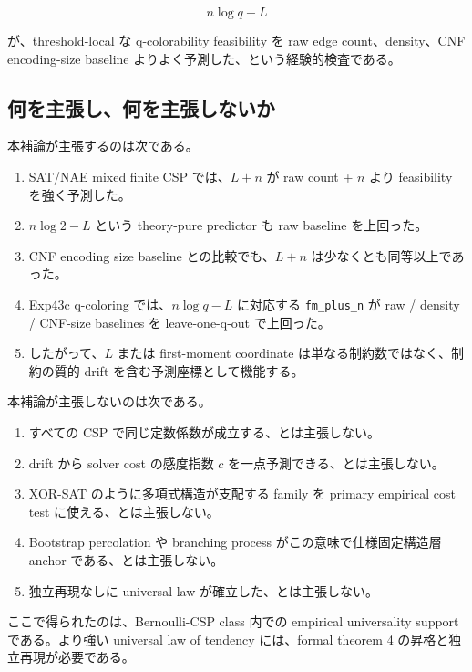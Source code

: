 \documentclass[12pt,a4paper]{article}
\begin{document}
\[
n\log q - L
\]

が、threshold-local な q-colorability feasibility を raw edge count、density、CNF encoding-size baseline よりよく予測した、という経験的検査である。

\subsection{何を主張し、何を主張しないか}\label{ux4f55ux3092ux4e3bux5f35ux3057ux4f55ux3092ux4e3bux5f35ux3057ux306aux3044ux304b}

本補論が主張するのは次である。

\begin{enumerate}
\def\labelenumi{\arabic{enumi}.}
\tightlist
\item
  SAT/NAE mixed finite CSP では、\(L+n\) が raw count + \(n\) より feasibility を強く予測した。
\item
  \(n\log2-L\) という theory-pure predictor も raw baseline を上回った。
\item
  CNF encoding size baseline との比較でも、\(L+n\) は少なくとも同等以上であった。
\item
  Exp43c q-coloring では、\(n\log q-L\) に対応する \texttt{fm\_plus\_n} が raw / density / CNF-size baselines を leave-one-q-out で上回った。
\item
  したがって、\(L\) または first-moment coordinate は単なる制約数ではなく、制約の質的 drift を含む予測座標として機能する。
\end{enumerate}

本補論が主張しないのは次である。

\begin{enumerate}
\def\labelenumi{\arabic{enumi}.}
\tightlist
\item
  すべての CSP で同じ定数係数が成立する、とは主張しない。
\item
  drift から solver cost の感度指数 \(c\) を一点予測できる、とは主張しない。
\item
  XOR-SAT のように多項式構造が支配する family を primary empirical cost test に使える、とは主張しない。
\item
  Bootstrap percolation や branching process がこの意味で仕様固定構造層 anchor である、とは主張しない。
\item
  独立再現なしに universal law が確立した、とは主張しない。
\end{enumerate}

ここで得られたのは、Bernoulli-CSP class 内での empirical universality support である。より強い universal law of tendency には、formal theorem 4 の昇格と独立再現が必要である。
\end{document}
